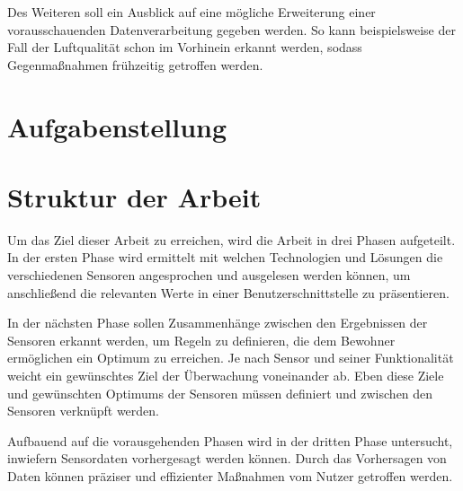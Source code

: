 Des Weiteren soll ein Ausblick auf eine mögliche Erweiterung einer vorausschauenden Datenverarbeitung gegeben werden. So kann beispielsweise der Fall der Luftqualität schon im Vorhinein erkannt werden, sodass Gegenmaßnahmen frühzeitig getroffen werden.
\section{Aufgabenstellung}
\section{Struktur der Arbeit}
Um das Ziel dieser Arbeit zu erreichen, wird die Arbeit in drei Phasen aufgeteilt. In der ersten Phase wird ermittelt mit welchen Technologien und Lösungen die verschiedenen Sensoren angesprochen und ausgelesen werden können, um anschließend die relevanten Werte in einer Benutzerschnittstelle zu präsentieren.

In der nächsten Phase sollen Zusammenhänge zwischen den Ergebnissen der Sensoren erkannt werden, um Regeln zu definieren, die dem Bewohner ermöglichen ein Optimum zu erreichen. Je nach Sensor und seiner Funktionalität weicht ein gewünschtes Ziel der Überwachung voneinander ab. Eben diese Ziele und gewünschten Optimums der Sensoren müssen definiert und zwischen den Sensoren verknüpft werden.

Aufbauend auf die vorausgehenden Phasen wird in der dritten Phase untersucht, inwiefern Sensordaten vorhergesagt werden können. Durch das Vorhersagen von Daten können präziser und effizienter Maßnahmen vom Nutzer getroffen werden.